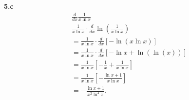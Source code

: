 \documentclass{report}
\begin{document}
    \bigbreak \noindent 
    \textbf{5.c}
    \bigbreak \noindent 
    \begin{align*}
        &\frac{d}{dx} \frac{1}{x\ln{x}} \\
        &\frac{1}{x\ln{x}} \cdot \frac{d}{dx}\ln{\left(\frac{1}{x\ln{x}}\right)} \\
        &=\frac{1}{x\ln{x}} \cdot \frac{d}{dx}\left[-\ln{\left(x\ln{x}\right)}\right] \\
        &=\frac{1}{x\ln{x}} \cdot  \frac{d}{dx} \left[-\ln{x} +\ln{(\ln{(x)})}\right] \\
        &=\frac{1}{x\ln{x}} \left[-\frac{1}{x} + \frac{1}{x\ln{x}}\right] \\
        &= \frac{1}{x\ln{x}} \left[-\frac{\ln{x} + 1}{x\ln{x}}\right] \\
        &= -\frac{\ln{x} + 1}{x^{2}\ln^{2}{x}}
    .\end{align*}



    
    
\end{document}
